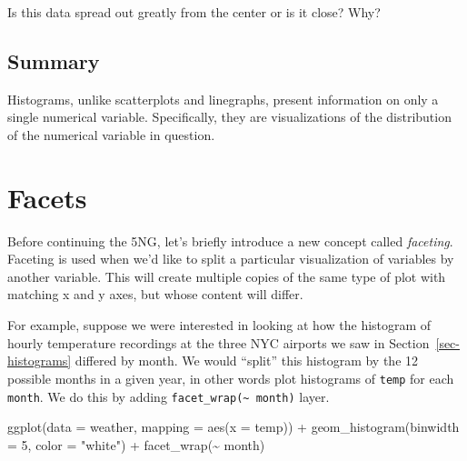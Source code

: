 \documentclass[
  letterpaper,
  DIV=11,
  numbers=noendperiod]{scrreprt}
\newenvironment{Shaded}{\begin{snugshade}}{\end{snugshade}}
\newcommand{\AttributeTok}[1]{\textcolor[rgb]{0.40,0.45,0.13}{#1}}
\newcommand{\DecValTok}[1]{\textcolor[rgb]{0.68,0.00,0.00}{#1}}
\newcommand{\FunctionTok}[1]{\textcolor[rgb]{0.28,0.35,0.67}{#1}}
\newcommand{\NormalTok}[1]{\textcolor[rgb]{0.00,0.23,0.31}{#1}}
\newcommand{\SpecialCharTok}[1]{\textcolor[rgb]{0.37,0.37,0.37}{#1}}
\newcommand{\StringTok}[1]{\textcolor[rgb]{0.13,0.47,0.30}{#1}}
\theoremstyle{definition}
\theoremstyle{remark}
\begin{document}
\begin{tcolorbox}[enhanced jigsaw, coltitle=black, toprule=.15mm, bottomtitle=1mm, breakable, leftrule=.75mm, title={{🎯} Learning Check 2.17}, opacitybacktitle=0.6, colback=white, rightrule=.15mm, opacityback=0, toptitle=1mm, colbacktitle=quarto-callout-tip-color!10!white, colframe=quarto-callout-tip-color-frame, titlerule=0mm, arc=.35mm, bottomrule=.15mm, left=2mm]
Is this data spread out greatly from the center or is it close? Why?
\end{tcolorbox}

\hypertarget{summary-2}{%
\subsection{Summary}\label{summary-2}}

Histograms, unlike scatterplots and linegraphs, present information on
only a single numerical variable. Specifically, they are visualizations
of the distribution of the numerical variable in question.

\hypertarget{sec-facets}{%
\section{Facets}\label{sec-facets}}

Before continuing the 5NG, let's briefly introduce a new concept called
\emph{faceting}. Faceting is used when we'd like to split a particular
visualization of variables by another variable. This will create
multiple copies of the same type of plot with matching x and y axes, but
whose content will differ.

For example, suppose we were interested in looking at how the histogram
of hourly temperature recordings at the three NYC airports we saw in
Section~\ref{sec-histograms} differed by month. We would ``split'' this
histogram by the 12 possible months in a given year, in other words plot
histograms of \texttt{temp} for each \texttt{month}. We do this by
adding \texttt{facet\_wrap(\textasciitilde{}\ month)} layer.

\begin{Shaded}
\begin{Highlighting}[]
\FunctionTok{ggplot}\NormalTok{(}\AttributeTok{data =}\NormalTok{ weather, }\AttributeTok{mapping =} \FunctionTok{aes}\NormalTok{(}\AttributeTok{x =}\NormalTok{ temp)) }\SpecialCharTok{+}
  \FunctionTok{geom\_histogram}\NormalTok{(}\AttributeTok{binwidth =} \DecValTok{5}\NormalTok{, }\AttributeTok{color =} \StringTok{"white"}\NormalTok{) }\SpecialCharTok{+}
  \FunctionTok{facet\_wrap}\NormalTok{(}\SpecialCharTok{\textasciitilde{}}\NormalTok{ month)}
\end{Highlighting}
\end{Shaded}
\end{document}
